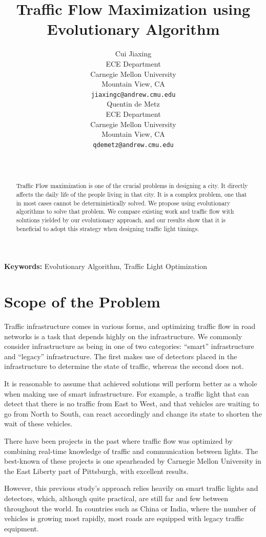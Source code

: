 \documentclass{article} %
\title{Traffic Flow Maximization using Evolutionary Algorithm}
\author{
Cui Jiaxing \\
ECE Department\\
Carnegie Mellon University\\
Mountain View, CA \\
\texttt{jiaxingc@andrew.cmu.edu} \\
\And
Quentin de Metz \\
ECE Department \\
Carnegie Mellon University\\
Mountain View, CA \\
\texttt{qdemetz@andrew.cmu.edu} \\
\AND
  \\
\And
  \\
}
\begin{document}
\maketitle

\begin{abstract}
Traffic Flow maximization is one of the crucial problems in designing a city. It directly affects the daily life of the people living in that city. It is a complex problem, one that in most cases cannot be deterministically solved. We propose using evolutionary algorithms to solve that problem. We compare existing work and traffic flow with solutions yielded by our evolutionary approach, and our results show that it is beneficial to adopt this strategy when designing traffic light timings.
\end{abstract}
\textbf{Keywords:} \hspace{0.2em} Evolutionary Algorithm, Traffic Light Optimization
\section{Scope of the Problem}

Traffic infrastructure comes in various forms, and optimizing traffic flow in road networks is a task that depends highly on the infrastructure. We commonly consider infrastructure as being in one of two categories:  ``smart'' infrastructure and ``legacy'' infrastructure. The first makes use of detectors placed in the infrastructure to determine the state of traffic, whereas the second does not.

It is reasonable to assume that achieved solutions will perform better as a whole when making use of smart infrastructure. For example, a traffic light that can detect that there is no traffic from East to West, and that vehicles are waiting to go from North to South, can react accordingly and change its state to shorten the wait of these vehicles.

There have been projects in the past where traffic flow was optimized by combining real-time knowledge of traffic and communication between lights. The best-known of these projects is one spearheaded by Carnegie Mellon University in the East Liberty part of Pittsburgh, with excellent results.

However, this previous study's approach relies heavily on smart traffic lights and detectors, which, although quite practical, are still far and few between throughout the world. In countries such as China or India, where the number of vehicles is growing most rapidly, most roads are equipped with legacy traffic equipment.
\end{document}

